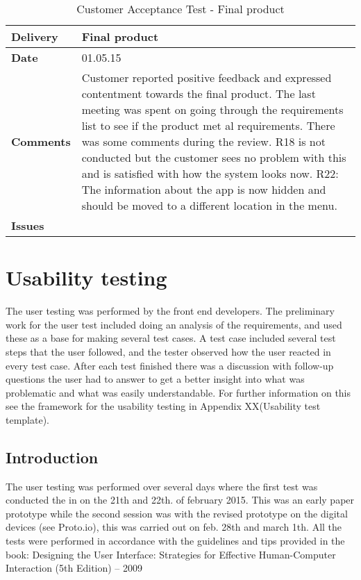 \begin{center}
\begin{longtable}{ | p{4cm} | p{13cm} | }
					
					
				\end{longtable}
			\end{center}
			
			\renewcommand{\arraystretch}{2}%
			\begin{center}
				\begin{longtable}{ | p{4cm} | p{13cm} | }
					
					\caption[Customer Acceptance Test - Final product]{Customer Acceptance Test - Final product} \label{Tab:cattest5}\\
					\hline
					\textbf{Delivery} & Final product\\ \hline
					\textbf{Date} & 01.05.15 \\ \hline
					\textbf{Comments} & Customer reported positive feedback and expressed contentment towards the final product.  The last meeting was spent on going through the requirements list to see if the product met al requirements. There was some comments during the review. 
					R18 is not conducted but the customer sees no problem with this and is satisfied with how the system looks now. 
					R22: The information about the app is now hidden and should be moved to a different location in the menu.   \\ \hline
					\textbf{Issues} \\ \hline
				\end{longtable}
			\end{center}
			
			\section{Usability testing}
			
			The user testing was performed by the front end developers. The preliminary work for the user test included doing an analysis of the requirements, and used these as a base for making several test cases. 
			A test case included several test steps that the user followed, and the tester observed how the user reacted in every test case. After each test finished there was a discussion with follow-up questions the user had to answer to get a better insight into what was problematic and what was easily understandable. For further information on this see the framework for the usability testing in Appendix XX(Usability test template).
			
			\subsection{Introduction}
			The user testing was performed over several days where the first test was conducted the in on the 21th and 22th. of february 2015. This was an early paper prototype while the second session was with the revised prototype on the digital devices (see Proto.io), this was carried out on feb. 28th and march 1th. All the tests were performed in accordance with the guidelines and tips provided in the book: Designing the User Interface: Strategies for Effective Human-Computer Interaction (5th Edition) – 2009 
			
